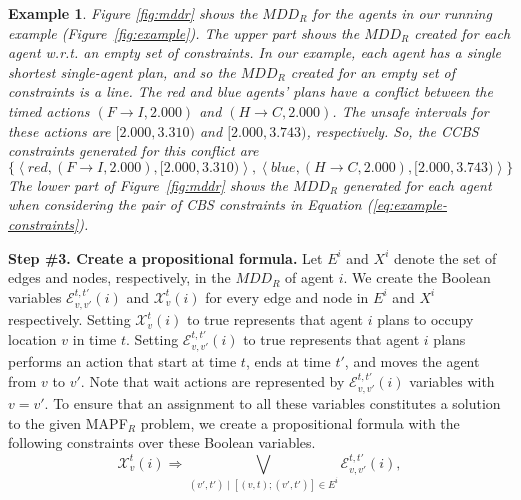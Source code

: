 \documentclass[review]{elsarticle}
\newtheorem{example}{Example}
\newcommand{\tuple}[1]{\ensuremath{\left \langle #1 \right \rangle }}
\newcommand{\mddr}{\ensuremath{MDD_R}\xspace}
\newcommand\konstantin[1]{\nb{\textbf{Konstantin:}}{red}{#1}}
\newcommand\roni[1]{\nb{\textbf{Roni:}}{green}{#1}}
\newcommand{\ccbs}{\ac{CCBS}\xspace}
\newcommand{\cbs}{\ac{CBS}\xspace}
\newcommand{\mapfr}{\ac{MAPF}$_R$\xspace}
\begin{document}
\begin{example}
Figure \ref{fig:mddr} shows the \mddr for the agents in our running example (Figure~\ref{fig:example}). The upper part shows the \mddr created for each agent w.r.t. an empty set of constraints. 
In our example, each agent has a single shortest single-agent plan, and so the \mddr 
created for an empty set of constraints is a line. 
The red and blue agents' plans have a conflict between the timed actions $(F\rightarrow I, 2.000)$ and $(H \rightarrow C, 2.000)$. 
The unsafe intervals for these actions are $[2.000,3.310)$ and $[2.000,3.743)$, respectively. 
So, the \ccbs constraints generated for this conflict are
\begin{equation}
    \{ \tuple{red, (F\rightarrow I, 2.000), [2.000,3.310)}, 
    \tuple{blue, (H\rightarrow C, 2.000), [2.000,3.743)} \}
    \label{eq:example-constraints}
\end{equation}
The lower part of Figure~\ref{fig:mddr} shows the \mddr generated for each agent when considering the pair of \cbs constraints in Equation (\ref{eq:example-constraints}).
\end{example}





\textbf{Step \#3. Create a propositional formula.}
Let $E^i$ and $X^i$ denote the set of edges and nodes, respectively, in the \mddr of agent $i$.
We create the Boolean variables $\mathcal{E}_{v,v'}^{t,t'}(i)$ and $\mathcal{X}_{v}^{t}(i)$ 
for every edge and node in $E^i$ and $X^i$ respectively. 
Setting $\mathcal{X}_v^t(i)$ to true represents that agent $i$ plans to occupy location $v$ in time $t$. 
Setting $\mathcal{E}_{v,v'}^{t,t'}(i)$ to true represents that agent $i$ plans performs an action that start at time $t$, ends at time $t'$, and moves the agent from $v$ to $v'$. 
Note that wait actions are represented by $\mathcal{E}_{v,v'}^{t,t'}(i)$ variables with $v=v'$. 
To ensure that an assignment to all these variables constitutes a solution to the given \mapfr problem, 
we create a propositional formula with the following constraints over these Boolean variables. 
\begin{equation}
{  \mathcal{X}_v^t(i) \Rightarrow \bigvee_{(v',t')\;|\;[(v,t);(v',t')] \in E^i}{\mathcal{E}^{t,t'}_{v,v'}(i)},
}
\label{eq-1}
\end{equation}
\end{document}
